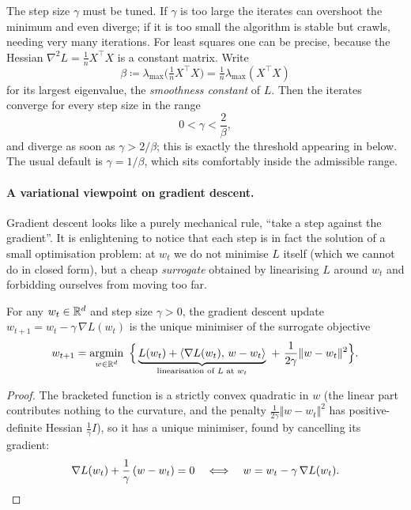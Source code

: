 \begin{remark}
\label{rem:step-size}
The step size $\gamma$ must be tuned. If $\gamma$ is too large the iterates can
overshoot the minimum and even diverge; if it is too small the algorithm is
stable but crawls, needing very many iterations. For least squares one can be
precise, because the Hessian $\nabla^2 L = \tfrac{1}{n} X^\top X$ is a constant
matrix. Write
\[
\beta \coloneqq \lambda_{\max}\big(\tfrac{1}{n} X^\top X\big) = \tfrac{1}{n}\lambda_{\max}(X^\top X)
\]
for its largest eigenvalue, the \emph{smoothness constant} of $L$. Then the iterates
converge for every step size in the range
\[
0 < \gamma < \frac{2}{\beta} ,
\]
and diverge as soon as $\gamma > 2/\beta$;
this is exactly the threshold appearing in
 below. The usual default is $\gamma = 1/\beta$, which sits
comfortably inside the admissible range.
\end{remark}

\paragraph{A variational viewpoint on gradient descent.}
Gradient descent looks like a purely mechanical rule, ``take a step against the
gradient''. It is enlightening to notice that each step is in fact the solution of a
small optimisation problem: at $w_t$ we do not minimise $L$ itself (which we cannot
do in closed form), but a cheap \emph{surrogate} obtained by linearising $L$ around
$w_t$ and forbidding ourselves from moving too far.

\begin{prop}
\label{prop:gd-variational}
For any $w_t \in \mathbb{R}^d$ and step size $\gamma > 0$, the gradient descent update
$w_{t+1} = w_t - \gamma\, \nabla L(w_t)$ is the unique minimiser of the surrogate
objective
\[
w_{t+1} = \operatorname*{argmin}_{w \in \mathbb{R}^d} \ \Big\{
\underbrace{L(w_t) + \langle \nabla L(w_t),\, w - w_t \rangle}_{\text{linearisation of } L \text{ at } w_t}
\ + \ \frac{1}{2\gamma} \Vert w - w_t \Vert^2 \Big\} .
\]
\end{prop}

\begin{proof}
The bracketed function is a strictly convex quadratic in $w$ (the linear part
contributes nothing to the curvature, and the penalty $\tfrac{1}{2\gamma}\Vert w - w_t
\Vert^2$ has positive-definite Hessian $\tfrac{1}{\gamma} I$), so it has a unique
minimiser, found by cancelling its gradient:
\[
\nabla L(w_t) + \frac{1}{\gamma}\, (w - w_t) = 0
\quad \Longleftrightarrow \quad
w = w_t - \gamma\, \nabla L(w_t) . \qedhere
\]
\end{proof}

